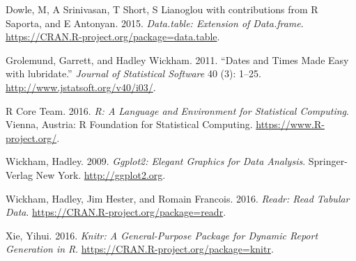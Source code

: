 \documentclass[]{article}
\begin{document}
\hypertarget{ref-data.table}{}
Dowle, M, A Srinivasan, T Short, S Lianoglou with contributions from R
Saporta, and E Antonyan. 2015. \emph{Data.table: Extension of
Data.frame}. \url{https://CRAN.R-project.org/package=data.table}.

\hypertarget{ref-lubridate}{}
Grolemund, Garrett, and Hadley Wickham. 2011. ``Dates and Times Made
Easy with lubridate.'' \emph{Journal of Statistical Software} 40 (3):
1--25. \url{http://www.jstatsoft.org/v40/i03/}.

\hypertarget{ref-baseR}{}
R Core Team. 2016. \emph{R: A Language and Environment for Statistical
Computing}. Vienna, Austria: R Foundation for Statistical Computing.
\url{https://www.R-project.org/}.

\hypertarget{ref-ggplot2}{}
Wickham, Hadley. 2009. \emph{Ggplot2: Elegant Graphics for Data
Analysis}. Springer-Verlag New York. \url{http://ggplot2.org}.

\hypertarget{ref-readr}{}
Wickham, Hadley, Jim Hester, and Romain Francois. 2016. \emph{Readr:
Read Tabular Data}. \url{https://CRAN.R-project.org/package=readr}.

\hypertarget{ref-knitr}{}
Xie, Yihui. 2016. \emph{Knitr: A General-Purpose Package for Dynamic
Report Generation in R}. \url{https://CRAN.R-project.org/package=knitr}.
\end{document}
